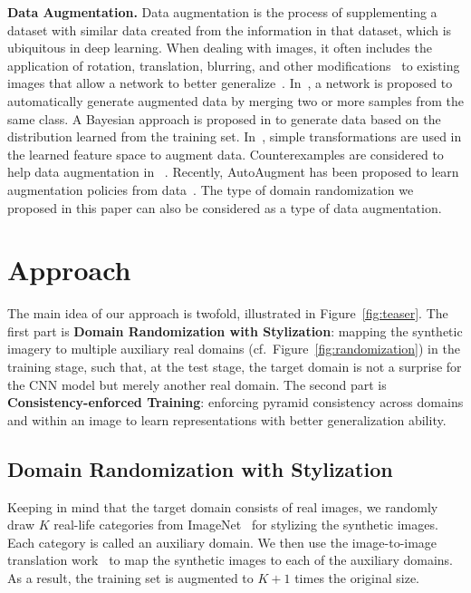 \documentclass[10pt,twocolumn,letterpaper]{article}
\begin{document}
\textbf{Data Augmentation.}
Data augmentation is the process of supplementing a dataset with similar data created from the information in that dataset, which is ubiquitous in deep learning. When dealing with images, it often includes the application of rotation, translation, blurring, and other modifications~\cite{ciregan2012multicolumn, wan2013regularization, sato2015apac} to existing images that allow a network to better generalize~\cite{simard2003best}. In~\cite{lemley2017smart}, a network is proposed to automatically generate augmented data by merging two or more samples from the same class. A Bayesian approach is proposed in \cite{tran2017bayesian} to generate data based on the distribution learned from the training set. In~\cite{devries2017dataset},  simple transformations are used in the learned feature space to augment data. Counterexamples are considered to help data augmentation in ~\cite{dreossi2018counterexample}. Recently, AutoAugment has been proposed to learn augmentation policies from data~\cite{cubuk2018autoaugment}. The type of domain randomization we proposed in this paper can also be considered as a type of data augmentation. 




\section{Approach}

The main idea of our approach is twofold, illustrated in Figure~\ref{fig:teaser}. The first part is \textbf{Domain Randomization with Stylization}: mapping the synthetic imagery to multiple auxiliary real domains (cf.\ Figure~\ref{fig:randomization}) in the training stage, such that, at the test stage, the target domain is not a surprise for the CNN model but merely another real domain. The second part is \textbf{Consistency-enforced Training}: enforcing pyramid consistency across domains and within an image to learn representations with better generalization ability. 



\subsection{Domain Randomization with Stylization}
Keeping in mind that the target domain consists of real images, we randomly draw $K$ real-life categories from  ImageNet~\cite{deng2009imagenet}  for stylizing the synthetic images. Each category is called an auxiliary domain. We then use the image-to-image translation work~\cite{CycleGAN2017} to map the synthetic images to each of the auxiliary domains. As a result, the training set is augmented to $K+1$ times the original size.
\end{document}
